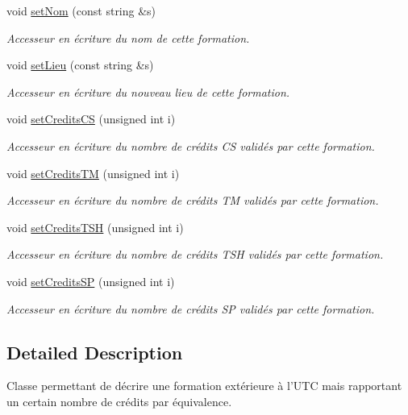 \begin{DoxyCompactItemize}
void \hyperlink{class_formation_exterieure_ad81e249506fdb1f104ef7474ff600220}{set\-Nom} (const string \&s)
\begin{DoxyCompactList}\small\item\em Accesseur en écriture du nom de cette formation. \end{DoxyCompactList}\item 
void \hyperlink{class_formation_exterieure_a9895b945b46b567648d8d31ede404c05}{set\-Lieu} (const string \&s)
\begin{DoxyCompactList}\small\item\em Accesseur en écriture du nouveau lieu de cette formation. \end{DoxyCompactList}\item 
void \hyperlink{class_formation_exterieure_af96fc3f4bd03c161ba4c09b4363917cd}{set\-Credits\-C\-S} (unsigned int i)
\begin{DoxyCompactList}\small\item\em Accesseur en écriture du nombre de crédits C\-S validés par cette formation. \end{DoxyCompactList}\item 
void \hyperlink{class_formation_exterieure_a2d2930c7cee5a173b2bfefd01136a1bd}{set\-Credits\-T\-M} (unsigned int i)
\begin{DoxyCompactList}\small\item\em Accesseur en écriture du nombre de crédits T\-M validés par cette formation. \end{DoxyCompactList}\item 
void \hyperlink{class_formation_exterieure_a8cd12ed44c76fcb439264e4e0c386de6}{set\-Credits\-T\-S\-H} (unsigned int i)
\begin{DoxyCompactList}\small\item\em Accesseur en écriture du nombre de crédits T\-S\-H validés par cette formation. \end{DoxyCompactList}\item 
void \hyperlink{class_formation_exterieure_a44e44569507d7afbb9c39d20975748b6}{set\-Credits\-S\-P} (unsigned int i)
\begin{DoxyCompactList}\small\item\em Accesseur en écriture du nombre de crédits S\-P validés par cette formation. \end{DoxyCompactList}\end{DoxyCompactItemize}


\subsection{Detailed Description}
Classe permettant de décrire une formation extérieure à l'U\-T\-C mais rapportant un certain nombre de crédits par équivalence. 

